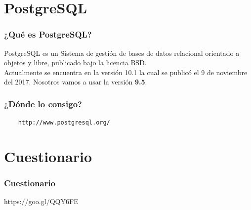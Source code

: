 \documentclass{beamer}
\begin{document}
\section{PostgreSQL}

\begin{frame}
  \frametitle{¿Qué es PostgreSQL?}
  PostgreSQL es un Sistema de gestión de bases de datos relacional orientado a
  objetos y libre, publicado bajo la licencia BSD.\\
  Actualmente se encuentra en la versión 10.1 la cual se publicó el 9
  de noviembre del 2017. Nosotros vamos a usar la versión \textbf{9.5}.
\end{frame}

\begin{frame}[fragile]
  \frametitle{¿Dónde lo consigo?}
  \begin{verbatim}
    http://www.postgresql.org/
  \end{verbatim}
\end{frame}

\section{Cuestionario}

\begin{frame}
  \frametitle{Cuestionario}
  https://goo.gl/QQY6FE
\end{frame}
\end{document}
